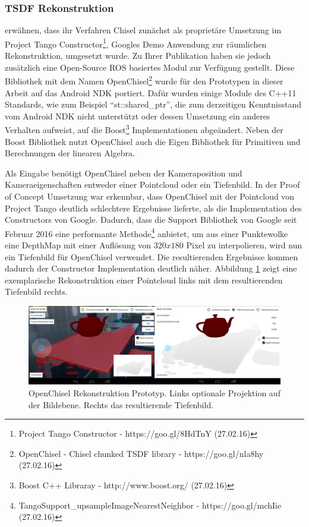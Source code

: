 \subsubsection*{TSDF Rekonstruktion}

\citet{Klingensmith_2015_7924} erwähnen, dass ihr Verfahren Chisel zunächst als proprietäre Umsetzung im Project Tango Constructor\footnote{Project Tango Constructor - https://goo.gl/8HdTnY (27.02.16)}, Googles Demo Anwendung zur räumlichen Rekonstruktion, umgesetzt wurde. Zu Ihrer Publikation haben sie jedoch zusätzlich eine Open-Source ROS basiertes Modul zur Verfügung gestellt. Diese Bibliothek mit dem Namen OpenChisel\footnote{OpenChisel - Chisel chunked TSDF library - https://goo.gl/nla8hy (27.02.16)} wurde für den Prototypen in dieser Arbeit auf das Android NDK portiert. Dafür wurden einige Module des C++11 Standards, wie zum Beispiel \enquote{st::shared\_ptr}, die zum derzeitigen Kenntnisstand vom Android NDK nicht unterstützt oder dessen Umsetzung ein anderes Verhalten aufweist, auf die Boost\footnote{Boost C++ Libraray - http://www.boost.org/ (27.02.16)} Implementationen abgeändert. Neben der Boost Bibliothek nutzt OpenChisel auch die Eigen Bibliothek für Primitiven und Berechnungen der linearen Algebra.

Als Eingabe benötigt OpenChisel neben der Kameraposition und Kameraeigenschaften entweder einer Pointcloud oder ein Tiefenbild. In der Proof of Concept Umsetzung war erkennbar, dass OpenChisel mit der Pointcloud von Project Tango deutlich schlechtere Ergebnisse lieferte, als die Implementation des Constructors von Google. Dadurch, dass die Support Bibliothek von Google seit Februar 2016 eine performante Methode\footnote{TangoSupport\_upsampleImageNearestNeighbor - https://goo.gl/mchIie (27.02.16)} anbietet, um aus einer Punktewolke eine DepthMap mit einer Auflösung von \(320x180\) Pixel zu interpolieren, wird nun ein Tiefenbild für OpenChisel verwendet. Die resultierenden Ergebnisse kommen dadurch der Constructor Implementation deutlich näher. Abbildung \ref{fig:chisel-demo} zeigt eine exemplarische Rekonstruktion einer Pointcloud links mit dem resultierenden Tiefenbild rechts.

\begin{figure}[h]
  \centering
	\includegraphics[width=1.0\textwidth]{content/images/implementation/chisel-demo.png} 
  \caption{OpenChisel Rekonstruktion Prototyp. Links optionale Projektion auf der Bildebene. Rechts das resultierende Tiefenbild.}
  \label{fig:chisel-demo}
\end{figure}
